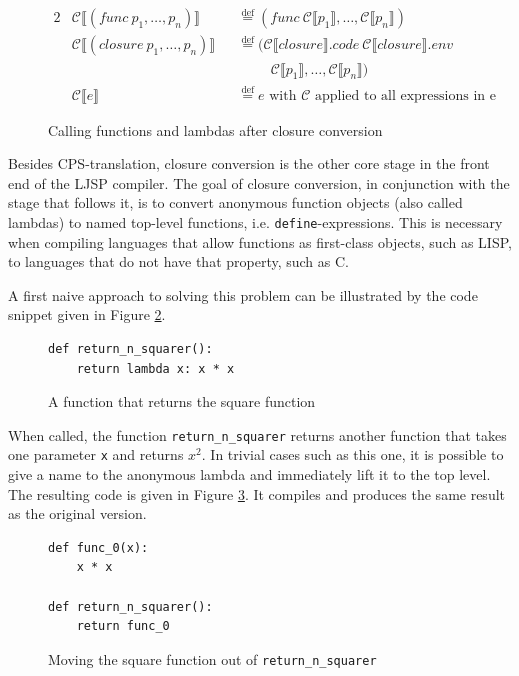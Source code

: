 \documentclass[11pt]{report}
\newcommand{\eqdef}{\stackrel{\text{def}}{=}}%
\begin{document}
\begin{figure}[p]
\begin{alignat*}{2}
&\mathcal{C}\llbracket (func\ p_1, \dots, p_n) \rrbracket &&\eqdef (func\  \mathcal{C}\llbracket p_1 \rrbracket, \dots, \mathcal{C}\llbracket p_n \rrbracket)\\
&\mathcal{C}\llbracket (closure\ p_1, \dots, p_n) \rrbracket &&\eqdef (\mathcal{C}\llbracket closure\rrbracket.code\ \mathcal{C}\llbracket closure\rrbracket.env\\\
&&&\hspace{1cm}\mathcal{C}\llbracket p_1\rrbracket, \dots, \mathcal{C}\llbracket p_n\rrbracket)\\
&\mathcal{C}\llbracket e \rrbracket && \eqdef e\text{ with $\mathcal{C}$ applied to all expressions in e}
\end{alignat*}
\caption{Calling functions and lambdas after closure conversion}
\label{cccall}
\end{figure}

Besides CPS-translation, closure conversion is the other core stage in the front end of the LJSP compiler. The goal of closure conversion, in conjunction with the stage that follows it, is to convert anonymous function objects (also called lambdas) to named top-level functions, i.e. \texttt{define}-expressions. This is necessary when compiling languages that allow functions as first-class objects, such as LISP, to languages that do not have that property, such as C.

A first naive approach to solving this problem can be illustrated by the code snippet given in Figure \ref{cc1}.

\begin{figure}[h!]
\begin{lstlisting}
def return_n_squarer():
    return lambda x: x * x
\end{lstlisting}
\caption{A function that returns the square function}
\label{cc1}
\end{figure}

When called, the function \texttt{return_n_squarer} returns another function that takes one parameter \texttt{x} and returns $x^2$. In trivial cases such as this one, it is possible to give a name to the anonymous lambda and immediately lift it to the top level. The resulting code is given in Figure \ref{cc2}. It compiles and produces the same result as the original version.

\begin{figure}[h!]
\begin{lstlisting}
def func_0(x):
    x * x
    
def return_n_squarer():
    return func_0
\end{lstlisting}
\caption{Moving the square function out of \texttt{return_n_squarer}}
\label{cc2}
\end{figure}
\end{document}
